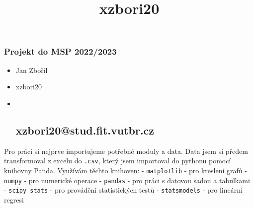 \documentclass[11pt]{article}
\title{xzbori20}
\begin{document}
    
    \maketitle
    
    

    
    \hypertarget{projekt-do-msp-20222023}{%
\subsubsection{Projekt do MSP 2022/2023}\label{projekt-do-msp-20222023}}

\begin{itemize}
\item
  Jan Zbořil
\item
  xzbori20
\item ~
  \hypertarget{xzbori20stud.fit.vutbr.cz}{%
  \subsection{xzbori20@stud.fit.vutbr.cz}\label{xzbori20stud.fit.vutbr.cz}}
\end{itemize}

    Pro práci si nejprve importujeme potřebné moduly a data. Data jsem si
předem transformoval z excelu do \texttt{.csv}, který jsem importoval do
pythonu pomocí knihovny Panda. Využívám těchto knihoven: -
\texttt{matplotlib} - pro kreslení grafů - \texttt{numpy} - pro
numerické operace - \texttt{pandas} - pro práci s datovou sadou a
tabulkami - \texttt{scipy\ stats} - pro provádění statistických testů -
\texttt{statsmodels} - pro lineární regresi
\end{document}
